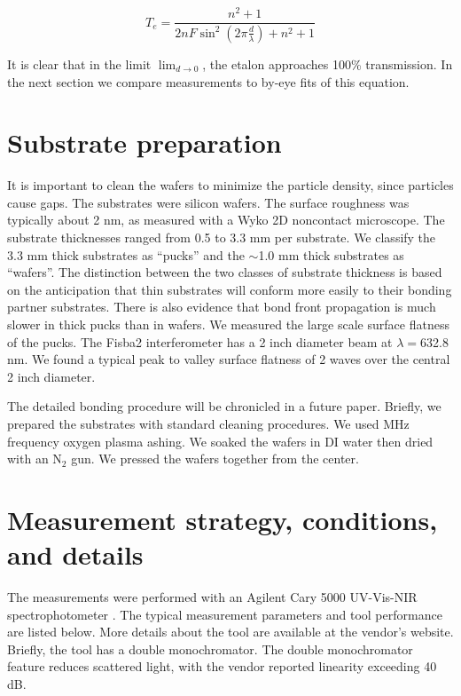 \documentclass[osajnl,preprint,showpacs,superscriptaddress,12pt]{revtex4-1} %
\begin{document}
$$T_{e} = \frac{n^2+1}{2 n F \sin ^2(2\pi \frac{d}{\lambda})+n^2+1} \nonumber $$


It is clear that in the limit $\lim_{d \rightarrow 0}$, the etalon approaches 100\% transmission.  In the next section we compare measurements to by-eye fits of this equation.


\section{Substrate preparation}
It is important to clean the wafers to minimize the particle density, since particles cause gaps.  The substrates were silicon wafers.  The surface roughness was typically about 2 nm, as measured with a Wyko 2D noncontact microscope.  The substrate thicknesses ranged from 0.5 to 3.3 mm per substrate.  We classify the 3.3 mm thick substrates as ``pucks'' and the $\sim$1.0 mm thick substrates as ``wafers''.  The distinction between the two classes of substrate thickness is based on the anticipation that thin substrates will conform more easily to their bonding partner substrates.  There is also evidence that bond front propagation is much slower in thick pucks \cite{2007ApOpt..46.6793H} than in wafers.  We measured the large scale surface flatness of the pucks.  The Fisba2 interferometer has a 2 inch diameter beam at $\lambda=$632.8 nm.  We found a typical peak to valley surface flatness of 2 waves over the central 2 inch diameter.


The detailed bonding procedure will be chronicled in a future paper.  Briefly, we prepared the substrates with standard cleaning procedures.  We used MHz frequency oxygen plasma ashing.  We soaked the wafers in DI water then dried with an N$_2$ gun.  We pressed the wafers together from the center.


\section{Measurement strategy, conditions, and details}
The measurements were performed with an Agilent Cary 5000 UV-Vis-NIR spectrophotometer \nocite{cary5000web}.  The typical measurement parameters and tool performance are listed below.  More details about the tool are available at the vendor's website.  Briefly, the tool has a double monochromator.  The double monochromator feature reduces scattered light, with the vendor reported linearity exceeding 40 dB.
\end{document}
